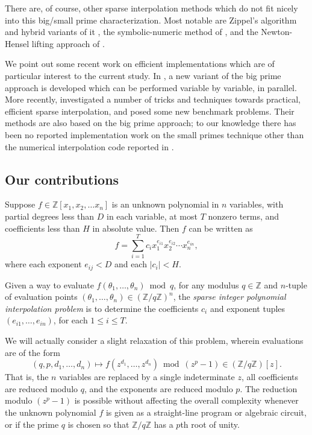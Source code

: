 \documentclass[letterpaper,10pt]{article}
\def\cite{\citep}
\newcommand{\ZZ}{\ensuremath{\mathbb{Z}}}
\begin{document}
There are, of course, other sparse interpolation methods which do not
fit nicely into this big/small prime characterization. Most notable are
Zippel's algorithm and hybrid variants of it \cite{Zip90,KL03}, the
symbolic-numeric method of \cite{Man95}, and the Newton-Hensel
lifting approach of \cite{AKP06}.

We point out some recent work on efficient implementations which are of
particular interest to the current study. In \cite{JM10}, a new variant
of the big prime approach is developed which can be performed variable
by variable, in parallel. More recently, \cite{HL15} investigated a
number of tricks and techniques towards practical, efficient sparse
interpolation, and posed some new benchmark problems. Their methods are
also based on the big prime approach; to our knowledge there has been no
reported implementation work on the small primes technique other than
the numerical interpolation code reported in \cite{GR11a}.

\subsection{Our contributions}

Suppose $f\in\ZZ[x_1, x_2,\ldots x_n]$ is an unknown polynomial in $n$
variables, with partial degrees less than $D$ in each variable,
at most $T$ nonzero terms, and coefficients less than $H$ in absolute
value. Then $f$ can be written as
\[f = \sum_{i=1}^T c_i x_1^{e_{i1}}x_2^{e_{i2}}\cdots{}x_n^{e_{in}},\]
where each exponent $e_{ij}< D$ and each $|c_i| < H$.

Given a way to evaluate $f(\theta_1,\ldots,\theta_n)\bmod q$, for any
modulus $q\in\ZZ$ and $n$-tuple of evaluation points
$(\theta_1,\ldots,\theta_n) \in (\ZZ/q\ZZ)^n$,
the \emph{sparse integer polynomial interpolation problem} is to
determine the coefficients $c_i$ and exponent tuples 
$(e_{i1},\ldots,e_{in})$, for each $1\le i\le T$.

We will actually consider a slight relaxation of this problem, wherein
evaluations are of the form
$$(q,p,d_1,\ldots,d_n)
  \mapsto f(z^{d_1},\ldots,z^{d_n}) \bmod (z^p-1) \in (\ZZ/q\ZZ)[z].$$
That is, the $n$ variables are replaced by a single indeterminate $z$,
all coefficients are reduced modulo $q$, and the exponents are
reduced modulo $p$. The reduction modulo $(z^p-1)$ 
is possible without affecting the overall
complexity whenever the unknown polynomial $f$ is given as a
straight-line program or algebraic circuit, or if the prime $q$ is
chosen so that $\ZZ/q\ZZ$ has a $p$th root of unity.
\end{document}
